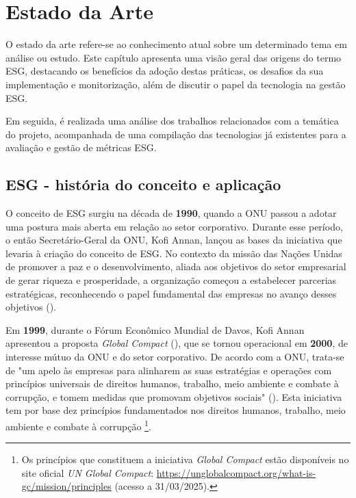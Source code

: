 \chapter{Estado da Arte}
\label{chap:EA}

O estado da arte refere-se ao conhecimento atual sobre um determinado tema em análise ou estudo. Este capítulo apresenta uma visão geral das origens do termo ESG, destacando os benefícios da adoção destas práticas, os desafios da sua implementação e monitorização, além de discutir o papel da tecnologia na gestão ESG.

Em seguida, é realizada uma análise dos trabalhos relacionados com a temática do projeto, acompanhada de uma compilação das tecnologias já existentes para a avaliação e gestão de métricas ESG.


\section{ESG - história do conceito e aplicação} 
\label{sec:OESG} 

O conceito de \gls{ESG} surgiu na década de \textbf{1990}, quando a \gls{ONU} passou a adotar uma postura mais aberta em relação ao setor corporativo. Durante esse período, o então Secretário-Geral da ONU, Kofi Annan, lançou as bases da iniciativa que levaria à criação do conceito de ESG. No contexto da missão das Nações Unidas de promover a paz e o desenvolvimento, aliada aos objetivos do setor empresarial de gerar riqueza e prosperidade, a organização começou a estabelecer parcerias estratégicas, reconhecendo o papel fundamental das empresas no avanço desses objetivos (\cite{Pollman2024}).

Em \textbf{1999}, durante o Fórum Econômico Mundial de Davos, Kofi Annan apresentou a proposta \textit{Global Compact} (\cite{Pollman2024}), que se tornou operacional em \textbf{2000}, de interesse mútuo da ONU e do setor corporativo. De acordo com a \gls{ONU}, trata-se de "um apelo às empresas para alinharem as suas estratégias e operações com princípios universais de direitos humanos, trabalho, meio ambiente e combate à corrupção, e tomem medidas que promovam objetivos sociais" (\cite{ONUGC2025}). Esta iniciativa tem por base dez princípios fundamentados nos direitos humanos, trabalho, meio ambiente e combate à corrupção \footnote{Os princípios que constituem a iniciativa \textit{Global Compact} estão disponíveis no site oficial \textit{UN Global Compact}: \url{https://unglobalcompact.org/what-is-gc/mission/principles} (acesso a 31/03/2025).}.

